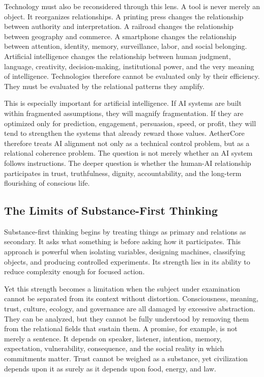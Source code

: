 \documentclass[12pt]{article}
\begin{document}
Technology must also be reconsidered through this lens. A tool is never merely an object. It reorganizes relationships. A printing press changes the relationship between authority and interpretation. A railroad changes the relationship between geography and commerce. A smartphone changes the relationship between attention, identity, memory, surveillance, labor, and social belonging. Artificial intelligence changes the relationship between human judgment, language, creativity, decision-making, institutional power, and the very meaning of intelligence. Technologies therefore cannot be evaluated only by their efficiency. They must be evaluated by the relational patterns they amplify.

This is especially important for artificial intelligence. If AI systems are built within fragmented assumptions, they will magnify fragmentation. If they are optimized only for prediction, engagement, persuasion, speed, or profit, they will tend to strengthen the systems that already reward those values. AetherCore therefore treats AI alignment not only as a technical control problem, but as a relational coherence problem. The question is not merely whether an AI system follows instructions. The deeper question is whether the human-AI relationship participates in trust, truthfulness, dignity, accountability, and the long-term flourishing of conscious life.

\subsection{The Limits of Substance-First Thinking}

Substance-first thinking begins by treating things as primary and relations as secondary. It asks what something is before asking how it participates. This approach is powerful when isolating variables, designing machines, classifying objects, and producing controlled experiments. Its strength lies in its ability to reduce complexity enough for focused action.

Yet this strength becomes a limitation when the subject under examination cannot be separated from its context without distortion. Consciousness, meaning, trust, culture, ecology, and governance are all damaged by excessive abstraction. They can be analyzed, but they cannot be fully understood by removing them from the relational fields that sustain them. A promise, for example, is not merely a sentence. It depends on speaker, listener, intention, memory, expectation, vulnerability, consequence, and the social reality in which commitments matter. Trust cannot be weighed as a substance, yet civilization depends upon it as surely as it depends upon food, energy, and law.
\end{document}
